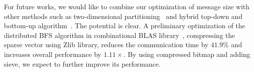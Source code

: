 \documentclass[conference]{IEEEtran}
\begin{document}
For future works, we would like to combine our optimization of message size
with other methods such as two-dimensional partitioning~\cite{Buluc:2011} and
hybrid top-down and bottom-up algorithm~\cite{Beamer:EECS-2011-117}. The
potential is clear. A preliminary optimization of the distributed BFS
algorithm in combinational BLAS library~\cite{combblas-buluc}, compressing the
sparse vector using Zlib library, reduces the communication time by $41.9\%$
and increases overall performance by $1.11\times$. By using compressed bitmap
and adding sieve, we expect to further improve its performance.
\end{document}
